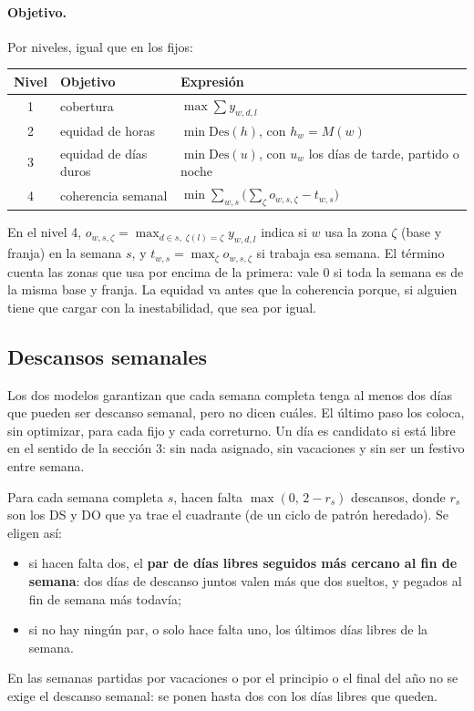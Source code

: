 \documentclass[11pt,a4paper]{article}
\begin{document}
\paragraph{Objetivo.} Por niveles, igual que en los fijos:
\begin{center}
\begin{tabular}{@{}cll@{}}
  \toprule
  Nivel & Objetivo & Expresión \\
  \midrule
  1 & cobertura & $\max \sum y_{w,d,l}$ \\
  2 & equidad de horas & $\min \mathrm{Des}(h)$, con $h_w = M(w)$ \\
  3 & equidad de días duros & $\min \mathrm{Des}(u)$, con $u_w$ los días de tarde, partido o noche \\
  4 & coherencia semanal & $\min \sum_{w,s} \bigl( \sum_\zeta o_{w,s,\zeta} - t_{w,s} \bigr)$ \\
  \bottomrule
\end{tabular}
\end{center}
En el nivel 4, $o_{w,s,\zeta} = \max_{d \in s,\; \zeta(l) = \zeta} y_{w,d,l}$ indica si $w$ usa
la zona $\zeta$ (base y franja) en la semana $s$, y $t_{w,s} = \max_\zeta o_{w,s,\zeta}$ si
trabaja esa semana. El término cuenta las zonas que usa por encima de la primera: vale 0 si toda
la semana es de la misma base y franja. La equidad va antes que la coherencia porque, si
alguien tiene que cargar con la inestabilidad, que sea por igual.

\subsection{Descansos semanales}

Los dos modelos garantizan que cada semana completa tenga al menos dos días que pueden ser
descanso semanal, pero no dicen cuáles. El último paso los coloca, sin optimizar, para cada fijo
y cada correturno. Un día es candidato si está libre en el sentido de la sección 3: sin nada
asignado, sin vacaciones y sin ser un festivo entre semana.

Para cada semana completa $s$, hacen falta $\max(0,\, 2 - r_s)$ descansos, donde $r_s$ son los DS
y DO que ya trae el cuadrante (de un ciclo de patrón heredado). Se eligen así:
\begin{itemize}[nosep]
  \item si hacen falta dos, el \textbf{par de días libres seguidos más cercano al fin de semana}:
        dos días de descanso juntos valen más que dos sueltos, y pegados al fin de semana más
        todavía;
  \item si no hay ningún par, o solo hace falta uno, los últimos días libres de la semana.
\end{itemize}
En las semanas partidas por vacaciones o por el principio o el final del año no se exige el
descanso semanal: se ponen hasta dos con los días libres que queden.
\end{document}
